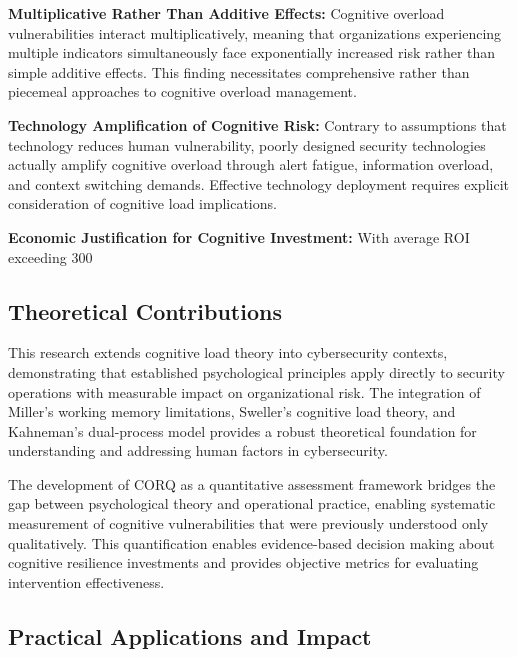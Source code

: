 \documentclass[11pt,a4paper]{article}
\begin{document}
\textbf{Multiplicative Rather Than Additive Effects:} Cognitive overload vulnerabilities interact multiplicatively, meaning that organizations experiencing multiple indicators simultaneously face exponentially increased risk rather than simple additive effects. This finding necessitates comprehensive rather than piecemeal approaches to cognitive overload management.

\textbf{Technology Amplification of Cognitive Risk:} Contrary to assumptions that technology reduces human vulnerability, poorly designed security technologies actually amplify cognitive overload through alert fatigue, information overload, and context switching demands. Effective technology deployment requires explicit consideration of cognitive load implications.

\textbf{Economic Justification for Cognitive Investment:} With average ROI exceeding 300%

\subsection{Theoretical Contributions}

This research extends cognitive load theory into cybersecurity contexts, demonstrating that established psychological principles apply directly to security operations with measurable impact on organizational risk. The integration of Miller's working memory limitations, Sweller's cognitive load theory, and Kahneman's dual-process model provides a robust theoretical foundation for understanding and addressing human factors in cybersecurity.

The development of CORQ as a quantitative assessment framework bridges the gap between psychological theory and operational practice, enabling systematic measurement of cognitive vulnerabilities that were previously understood only qualitatively. This quantification enables evidence-based decision making about cognitive resilience investments and provides objective metrics for evaluating intervention effectiveness.

\subsection{Practical Applications and Impact}
\end{document}
